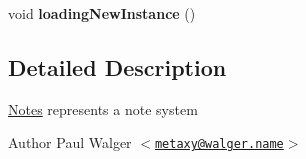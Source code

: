 \begin{DoxyCompactItemize}
\item 
\hypertarget{classNotes_a5793434ce1c926fcfe6341132b928fe9}{
void {\bfseries loadingNewInstance} ()}
\label{classNotes_a5793434ce1c926fcfe6341132b928fe9}

\end{DoxyCompactItemize}


\subsection{Detailed Description}
\hyperlink{classNotes}{Notes} represents a note system

\begin{DoxyAuthor}{Author}
Paul Walger $<$\href{mailto:metaxy@walger.name}{\tt metaxy@walger.name}$>$ 
\end{DoxyAuthor}


